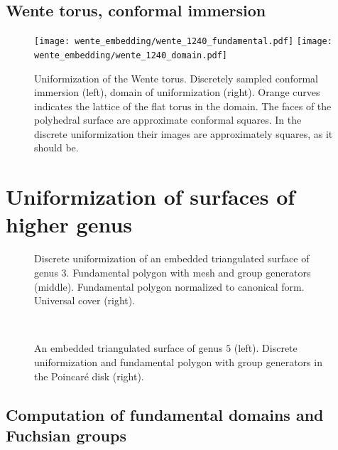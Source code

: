 \documentclass[Thesis.tex]{subfiles}
\begin{document}
\subsection{Wente torus, conformal immersion}

\begin{figure}
\centering
\texttt{[image: wente\_embedding/wente\_1240\_fundamental.pdf]}\hfill
\texttt{[image: wente\_embedding/wente\_1240\_domain.pdf]}
\caption{Uniformization of the Wente torus. Discretely sampled conformal immersion (left), domain of uniformization (right). Orange curves indicates the lattice of the flat torus in the domain. The faces of the polyhedral surface are approximate conformal squares. In the discrete uniformization their images are approximately squares, as it should be.}
\end{figure}


\section{Uniformization of surfaces of higher genus}

\begin{figure}
\centering
{}
\caption{Discrete uniformization of an embedded triangulated surface of genus $3$. Fundamental polygon with mesh and group generators (middle). Fundamental polygon normalized to canonical form. Universal cover (right).}
\label{fig:embedded_genus_3}
\end{figure}

\begin{figure}
\centering
{}\\
\caption{An embedded triangulated surface of genus $5$ (left). Discrete uniformization and fundamental polygon with  group generators in the Poincar\'e disk (right).}
\label{fig:embedded_genus_5}
\end{figure}





\subsection{Computation of fundamental domains and Fuchsian groups}
\label{sec:fundamental_domains}
\end{document}
